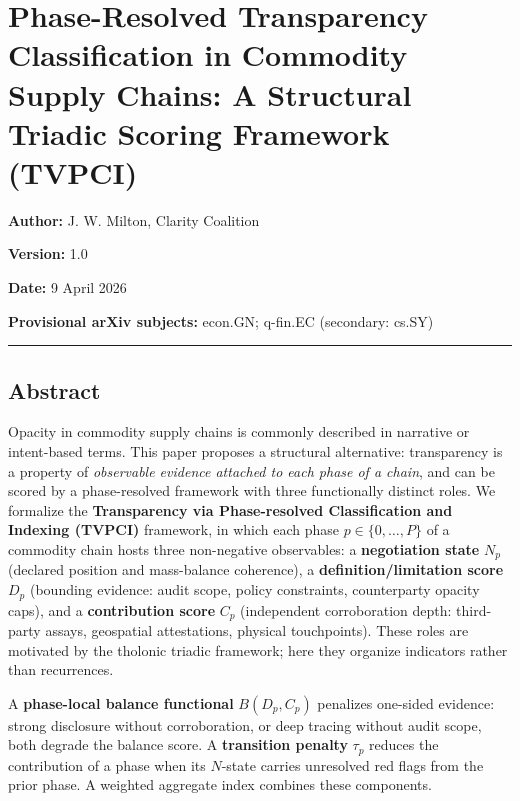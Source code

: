 \documentclass[
  11pt,
  letterpaper,
]{article}
\author{}
\date{}
\begin{document}
\section{Phase-Resolved Transparency Classification in Commodity Supply
Chains: A Structural Triadic Scoring Framework
(TVPCI)}\label{phase-resolved-transparency-classification-in-commodity-supply-chains-a-structural-triadic-scoring-framework-tvpci}

\textbf{Author:} J. W. Milton, Clarity Coalition

\textbf{Version:} 1.0

\textbf{Date:} 9 April 2026

\textbf{Provisional arXiv subjects:} econ.GN; q-fin.EC (secondary:
cs.SY)

\begin{center}\rule{0.5\linewidth}{0.5pt}\end{center}

\subsection{Abstract}\label{abstract}

Opacity in commodity supply chains is commonly described in narrative or
intent-based terms. This paper proposes a structural alternative:
transparency is a property of \emph{observable evidence attached to each
phase of a chain}, and can be scored by a phase-resolved framework with
three functionally distinct roles. We formalize the \textbf{Transparency
via Phase-resolved Classification and Indexing (TVPCI)} framework, in
which each phase \(p \in \{0,\ldots,P\}\) of a commodity chain hosts
three non-negative observables: a \textbf{negotiation state} \(N_p\)
(declared position and mass-balance coherence), a
\textbf{definition/limitation score} \(D_p\) (bounding evidence: audit
scope, policy constraints, counterparty opacity caps), and a
\textbf{contribution score} \(C_p\) (independent corroboration depth:
third-party assays, geospatial attestations, physical touchpoints).
These roles are motivated by the tholonic triadic framework; here they
organize indicators rather than recurrences.

A \textbf{phase-local balance functional} \(B(D_p, C_p)\) penalizes
one-sided evidence: strong disclosure without corroboration, or deep
tracing without audit scope, both degrade the balance score. A
\textbf{transition penalty} \(\tau_p\) reduces the contribution of a
phase when its \(N\)-state carries unresolved red flags from the prior
phase. A weighted aggregate index combines these components.
\end{document}
